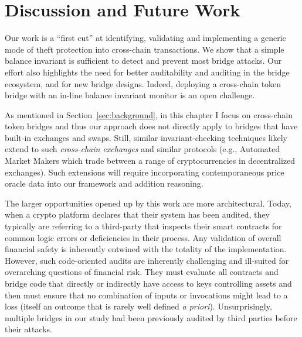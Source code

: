 \section{Discussion and Future Work}

\label{sec:discuss}
Our work is a ``first cut'' at identifying, validating and implementing a
generic mode of theft protection into cross-chain transactions. We show that a
simple balance invariant is sufficient to detect and prevent most bridge
attacks. Our effort also highlights the need for better auditability and
auditing in the bridge ecosystem, and for new bridge designs.  Indeed, deploying a cross-chain token bridge with an in-line balance invariant
monitor is an open challenge.

As mentioned in Section~\ref{sec:background}, in this chapter I focus on
cross-chain token bridges and thus our approach does not directly apply to
bridges that have built-in exchanges and swaps.  Still, similar
invariant-checking techniques likely extend to such \emph{cross-chain exchanges}
and similar protocols (e.g., Automated Market Makers which trade between a
range of cryptocurrencies in decentralized exchanges). Such extensions will
require incorporating contemporaneous price oracle data
into our framework
and addition reasoning.

The larger opportunities opened up by this work are
more architectural.  Today, when a crypto platform declares that their
system has been audited, they typically are referring to a third-party
that inspects their smart contracts for common logic errors or
deficiencies in their process.  Any validation of overall financial
safety is inherently entwined with the totality of the implementation.
However, such code-oriented audits are inherently challenging and
ill-suited for overarching questions of financial risk.  They must
evaluate all contracts and bridge code that directly or indirectly
have access to keys controlling assets and then must ensure that no
combination of inputs or invocations might lead to a loss (itself an
outcome that is rarely well defined \emph{a priori}).  Unsurprisingly,
multiple bridges in our study had been previously audited by third
parties before their attacks.

